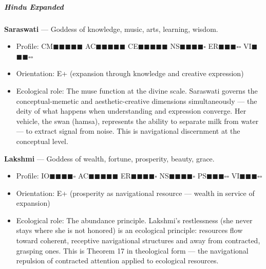 \subparagraph*{Hindu Expanded}


\textbf{Saraswati} — Goddess of knowledge, music, arts, learning, wisdom.

\begin{itemize}[nosep,leftmargin=*]
  \item Profile: CM$\blacksquare$$\blacksquare$$\blacksquare$$\blacksquare$$\blacksquare$ AC$\blacksquare$$\blacksquare$$\blacksquare$$\blacksquare$$\blacksquare$ CE$\blacksquare$$\blacksquare$$\blacksquare$$\blacksquare$$\blacksquare$ NS$\blacksquare$$\blacksquare$$\blacksquare$$\blacksquare$$\square$ ER$\blacksquare$$\blacksquare$$\blacksquare$$\square$$\square$ VI$\blacksquare$$\blacksquare$$\blacksquare$$\square$$\square$
  \item Orientation: E+ (expansion through knowledge and creative expression)
  \item Ecological role: The muse function at the divine scale. Saraswati governs the conceptual-memetic and aesthetic-creative dimensions simultaneously — the deity of what happens when understanding and expression converge. Her vehicle, the swan (hamsa), represents the ability to separate milk from water — to extract signal from noise. This is navigational discernment at the conceptual level.
\end{itemize}


\textbf{Lakshmi} — Goddess of wealth, fortune, prosperity, beauty, grace.

\begin{itemize}[nosep,leftmargin=*]
  \item Profile: IO$\blacksquare$$\blacksquare$$\blacksquare$$\blacksquare$$\square$ AC$\blacksquare$$\blacksquare$$\blacksquare$$\blacksquare$$\blacksquare$ ER$\blacksquare$$\blacksquare$$\blacksquare$$\blacksquare$$\square$ NS$\blacksquare$$\blacksquare$$\blacksquare$$\blacksquare$$\square$ PS$\blacksquare$$\blacksquare$$\blacksquare$$\square$$\square$ VI$\blacksquare$$\blacksquare$$\blacksquare$$\square$$\square$
  \item Orientation: E+ (prosperity as navigational resource — wealth in service of expansion)
  \item Ecological role: The abundance principle. Lakshmi's restlessness (she never stays where she is not honored) is an ecological principle: resources flow toward coherent, receptive navigational structures and away from contracted, grasping ones. This is Theorem 17 in theological form — the navigational repulsion of contracted attention applied to ecological resources.
\end{itemize}


